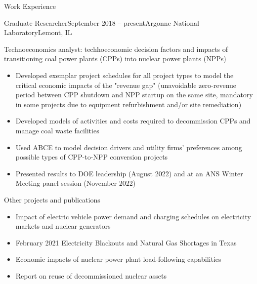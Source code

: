 \documentclass{resume} %
\begin{document}
\begin{rSection}{Work Experience}
\begin{rSubsection}{Graduate Researcher}{September 2018 -- present}{Argonne National Laboratory}{Lemont, IL}
  \item Technoeconomics analyst: techhoeconomic decision factors and impacts of transitioning coal power plants (CPPs) into nuclear power plants (NPPs)
  \begin{itemize}
    \item Developed exemplar project schedules for all project types to model the critical economic impacts of the "revenue gap" (unavoidable zero-revenue period between CPP shutdown and NPP startup on the same site, mandatory in some projects due to equipment refurbishment and/or site remediation)
    \item Developed models of activities and costs required to decommission CPPs and manage coal waste facilities
    \item Used ABCE to model decision drivers and utility firms' preferences among possible types of CPP-to-NPP conversion projects
    \item Presented results to DOE leadership (August 2022) and at an ANS Winter Meeting panel session (November 2022)
  \end{itemize}

  \item Other projects and publications
  \begin{itemize}
    \item Impact of electric vehicle power demand and charging schedules on electricity markets and nuclear generators
    \item February 2021 Electricity Blackouts and Natural Gas Shortages in Texas
    \item Economic impacts of nuclear power plant load-following capabilities
    \item Report on reuse of decommissioned nuclear assets
  \end{itemize}

\end{rSubsection}


\end{rSection}
\end{document}

